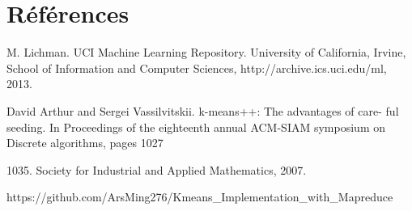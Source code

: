 \documentclass[12pt]{article}
\numberwithin{equation}{section}
\theoremstyle{plain}
\begin{document}
\section{Références }
\begin{enumerate}
\item M. Lichman. UCI Machine Learning Repository. University of
California, Irvine, School of Information and Computer Sciences,
http://archive.ics.uci.edu/ml, 2013.
\item David Arthur and Sergei Vassilvitskii. k-means++: The advantages of care-
ful seeding. In Proceedings of the eighteenth annual ACM-SIAM symposium
on Discrete algorithms, pages 1027{1035. Society for Industrial and Applied
Mathematics, 2007.
\item \color{blue} https://github.com/ArsMing276/Kmeans\_Implementation\_with\_Mapreduce
 \color{black}
}\end{enumerate}
\end{document}
